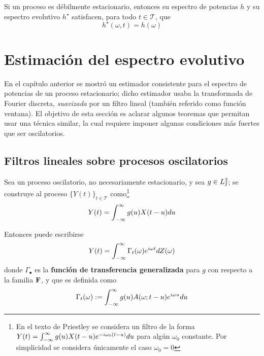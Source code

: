 \begin{proposicion}
Si un proceso \xt es débilmente estacionario, entonces su espectro de potencias $h$ y su espectro evolutivo $h^{\star}$ satisfacen, para todo $t\in \mathcal{T}$, que
\begin{equation}
h^{\star}(\omega, t) = h(\omega)
\end{equation}
\end{proposicion}


\section{Estimación del espectro evolutivo}
\label{sec:estimacion}

En el capítulo anterior se mostró un estimador consistente para el espectro de potencias de un proceso estacionario; dicho estimador usaba la transformada de Fourier discreta, \textit{suavizada} por un filtro lineal (también referido como función ventana).
%
El objetivo de esta sección es aclarar algunos teoremas que permitan usar una técnica similar, la cual requiere imponer algunas condiciones más fuertes que ser oscilatorios.

\subsection{Filtros lineales sobre procesos oscilatorios}

Sea \xt un proceso oscilatorio, no necesariamente estacionario, y sea $g\in L^{2}_I$; se construye al proceso $\{Y(t)\}_{t\in \mathcal{T}}$ como\footnote{En el texto de Priestley se considera un filtro de la forma $Y(t) = \int_{-\infty}^{\infty} g(u) X(t-u) e^{-i \omega_0 (t-u)} du$ para algún $\omega_0$ constante. 
%
Por simplicidad se considera únicamente el caso $\omega_0=0$}
\begin{equation}
Y(t) = \int_{-\infty}^{\infty} g(u) X(t-u) du
\end{equation}

Entonces puede escribirse 
\begin{equation}
Y(t) = \int_{-\infty}^{\infty} \Gamma_t(\omega) e^{i \omega t} dZ(\omega) 
\label{se6:filtrado}
\end{equation}
donde $\Gamma_\bullet$ es la \textbf{función de transferencia generalizada} para $g$ con respecto a la familia $\mathbf{F}$, y que es definida como
\begin{equation}
\Gamma_t (\omega) := \int_{-\infty}^{\infty} g(u) A(\omega; t-u) e^{i \omega u} du
\label{se6:trans_general}
\end{equation}

